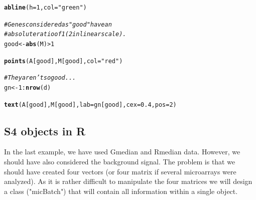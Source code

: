\documentclass[10pt]{article}\usepackage[]{graphicx}\usepackage[]{color}
\makeatletter
\newcommand{\hlnum}[1]{\textcolor[rgb]{0.686,0.059,0.569}{#1}}%
\newcommand{\hlstr}[1]{\textcolor[rgb]{0.192,0.494,0.8}{#1}}%
\newcommand{\hlcom}[1]{\textcolor[rgb]{0.678,0.584,0.686}{\textit{#1}}}%
\newcommand{\hlopt}[1]{\textcolor[rgb]{0,0,0}{#1}}%
\newcommand{\hlstd}[1]{\textcolor[rgb]{0.345,0.345,0.345}{#1}}%
\newcommand{\hlkwb}[1]{\textcolor[rgb]{0.69,0.353,0.396}{#1}}%
\newcommand{\hlkwc}[1]{\textcolor[rgb]{0.333,0.667,0.333}{#1}}%
\newcommand{\hlkwd}[1]{\textcolor[rgb]{0.737,0.353,0.396}{\textbf{#1}}}%
\newenvironment{kframe}{%
 \def\at@end@of@kframe{}%
 \ifinner\ifhmode%
  \def\at@end@of@kframe{\end{minipage}}%
  \begin{minipage}{\columnwidth}%
 \fi\fi%
 \def\FrameCommand##1{\hskip\@totalleftmargin \hskip-\fboxsep
 \colorbox{shadecolor}{##1}\hskip-\fboxsep
     \hskip-\linewidth \hskip-\@totalleftmargin \hskip\columnwidth}%
 \MakeFramed {\advance\hsize-\width
   \@totalleftmargin\z@ \linewidth\hsize
   \@setminipage}}%
 {\par\unskip\endMakeFramed%
 \at@end@of@kframe}
\newenvironment{knitrout}{}{} %
\makeatother
\begin{document}
\begin{knitrout}
\begin{kframe}
{\ttfamily\noindent\bfseries\color{errorcolor}{\#\# Error in int\_abline(a = a, b = b, h = h, v = v, untf = untf, ...): plot.new has not been called yet}}\begin{alltt}
\hlkwd{abline}\hlstd{(}\hlkwc{h}\hlstd{=}\hlnum{1}\hlstd{,} \hlkwc{col}\hlstd{=}\hlstr{"green"}\hlstd{)}
\end{alltt}


{\ttfamily\noindent\bfseries\color{errorcolor}{\#\# Error in int\_abline(a = a, b = b, h = h, v = v, untf = untf, ...): plot.new has not been called yet}}\begin{alltt}
\hlcom{# Genes considered as "good" have an}
\hlcom{# absolute ratio of 1 (2 in linear scale).}
\hlstd{good} \hlkwb{<-} \hlkwd{abs}\hlstd{(M)} \hlopt{>} \hlnum{1}
\end{alltt}


{\ttfamily\noindent\bfseries\color{errorcolor}{\#\# Error in eval(expr, envir, enclos): object 'M' not found}}\begin{alltt}
\hlkwd{points}\hlstd{(A[good], M[good],} \hlkwc{col}\hlstd{=}\hlstr{"red"}\hlstd{)}
\end{alltt}


{\ttfamily\noindent\bfseries{}}\begin{alltt}
\hlcom{# They aren't so good...}
\hlstd{gn} \hlkwb{<-} \hlnum{1}\hlopt{:}\hlkwd{nrow}\hlstd{(d)}
\end{alltt}


{\ttfamily\noindent\bfseries\color{errorcolor}{\#\# Error in nrow(d): object 'd' not found}}\begin{alltt}
\hlkwd{text}\hlstd{(A[good], M[good],} \hlkwc{lab}\hlstd{=gn[good],}\hlkwc{cex}\hlstd{=}\hlnum{0.4}\hlstd{,}\hlkwc{pos}\hlstd{=}\hlnum{2}\hlstd{)}
\end{alltt}


{\ttfamily\noindent\bfseries\color{errorcolor}{\#\# Error in text(A[good], M[good], lab = gn[good], cex = 0.4, pos = 2): object 'A' not found}}\end{kframe}
\end{knitrout}


\subsection{S4 objects in R}
In the last example, we have used Gmedian and  Rmedian data. However, we should have also considered the background signal. The problem is that we should have created four vectors (or four matrix if several microarrays were analyzed). As it is rather difficult to manipulate the four matrices we will design a class ("micBatch") that will contain all information within a single object.
\end{document}
